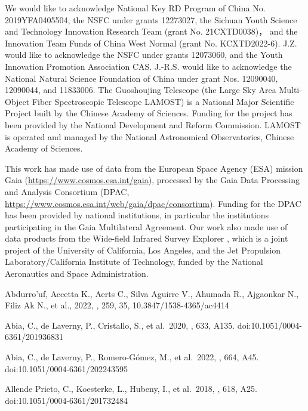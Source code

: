 \documentclass[manuscript]{aastex62}
\begin{document}
\begin{CJK*}{UTF8}{gbsn}
\acknowledgments

We would like to acknowledge National Key RD Program of China No. 2019YFA0405504, the NSFC under grants 12273027, the Sichuan Youth Science and Technology Innovation Research Team (grant No. 21CXTD0038)，
and the Innovation Team Funds of China West Normal (grant No. KCXTD2022-6).
J.Z. would like to acknowledge the NSFC under grants 12073060, and the Youth Innovation Promotion Association CAS. J.-R.S. would like to acknowledge the National Natural Science Foundation of China under grant Nos. 12090040, 12090044, and 11833006. The Guoshoujing Telescope (the Large Sky Area Multi-Object Fiber Spectroscopic Telescope LAMOST) is a National Major Scientific Project built by the Chinese Academy of Sciences. Funding for the project has been provided by the National Development and Reform Commission. LAMOST is operated and managed by the National Astronomical Observatories, Chinese Academy of Sciences.

This work has made use of data from the European Space Agency (ESA) mission Gaia (\url{https://www.cosmos.esa.int/gaia}), processed by the Gaia Data Processing and Analysis Consortium (DPAC, \url{https://www.cosmos.esa.int/web/gaia/dpac/consortium}). Funding for the DPAC has been provided by national institutions, in particular the institutions participating in the Gaia Multilateral Agreement. Our work also made use of data products from the
Wide-field Infrared Survey Explorer \citep[ALLWISE Source Catalog;][]{2013wise.rept....1C}, which is a joint
project of the University of California, Los Angeles,
and the Jet Propulsion Laboratory/California Institute
of Technology, funded by the National Aeronautics and
Space Administration.


\begin{thebibliography}{}

 Abdurro'uf, Accetta K., Aerts C., Silva Aguirre V., Ahumada R., Ajgaonkar N., Filiz Ak N., et al., 2022, \apjs, 259, 35, 10.3847/1538-4365/ac4414

 Abia, C., de Laverny, P., Cristallo, S., et al.\ 2020, \aap, 633, A135. doi:10.1051/0004-6361/201936831

 Abia, C., de Laverny, P., Romero-G{\'o}mez, M., et al.\ 2022, \aap, 664, A45. doi:10.1051/0004-6361/202243595

 Allende Prieto, C., Koesterke, L., Hubeny, I., et al.\ 2018, \aap, 618, A25. doi:10.1051/0004-6361/201732484


\end{thebibliography}
\end{CJK*}
\end{document}
